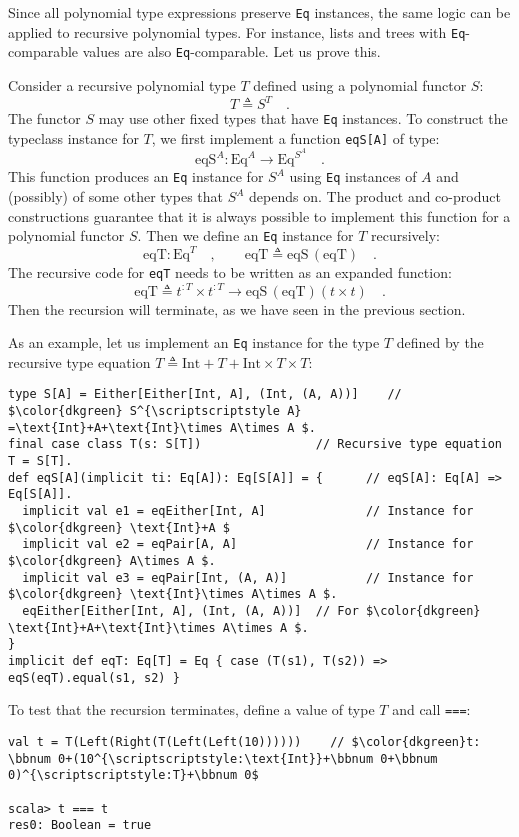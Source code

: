 Since all polynomial type expressions preserve \lstinline!Eq! instances,
the same logic can be applied to recursive polynomial types. For instance,
lists and trees with \lstinline!Eq!-comparable values are also \lstinline!Eq!-comparable.
Let us prove this.

Consider a recursive polynomial type $T$ defined using a polynomial
functor $S$:
\[
T\triangleq S^{T}\quad.
\]
The functor $S$ may use other fixed types that have \lstinline!Eq!
instances. To construct the typeclass instance for $T$, we first
implement a function \lstinline!eqS[A]! of type:
\[
\text{eqS}^{A}:\text{Eq}^{A}\rightarrow\text{Eq}^{S^{A}}\quad.
\]
This function produces an \lstinline!Eq! instance for $S^{A}$ using
\lstinline!Eq! instances of $A$ and (possibly) of some other types
that $S^{A}$ depends on. The product and co-product constructions
guarantee that it is always possible to implement this function for
a polynomial functor $S$. Then we define an \lstinline!Eq! instance
for $T$ recursively:
\[
\text{eqT}:\text{Eq}^{T}\quad,\quad\quad\text{eqT}\triangleq\text{eqS}\,(\text{eqT})\quad.
\]
The recursive code for \lstinline!eqT! needs to be written as an
expanded function:
\[
\text{eqT}\triangleq t^{:T}\times t^{:T}\rightarrow\text{eqS}\,(\text{eqT})\left(t\times t\right)\quad.
\]
Then the recursion will terminate, as we have seen in the previous
section.

As an example, let us implement an \lstinline!Eq! instance for the
type $T$ defined by the recursive type equation $T\triangleq\text{Int}+T+\text{Int}\times T\times T$:
\begin{lstlisting}[mathescape=true]
type S[A] = Either[Either[Int, A], (Int, (A, A))]    // $\color{dkgreen} S^{\scriptscriptstyle A} =\text{Int}+A+\text{Int}\times A\times A $.
final case class T(s: S[T])                // Recursive type equation T = S[T].
def eqS[A](implicit ti: Eq[A]): Eq[S[A]] = {      // eqS[A]: Eq[A] => Eq[S[A]].
  implicit val e1 = eqEither[Int, A]              // Instance for $\color{dkgreen} \text{Int}+A $
  implicit val e2 = eqPair[A, A]                  // Instance for $\color{dkgreen} A\times A $.
  implicit val e3 = eqPair[Int, (A, A)]           // Instance for $\color{dkgreen} \text{Int}\times A\times A $.
  eqEither[Either[Int, A], (Int, (A, A))]  // For $\color{dkgreen} \text{Int}+A+\text{Int}\times A\times A $.
}
implicit def eqT: Eq[T] = Eq { case (T(s1), T(s2)) => eqS(eqT).equal(s1, s2) }
\end{lstlisting}
To test that the recursion terminates, define a value of type $T$
and call \lstinline!===!:
\begin{lstlisting}[mathescape=true]
val t = T(Left(Right(T(Left(Left(10))))))    // $\color{dkgreen}t: \bbnum 0+(10^{\scriptscriptstyle:\text{Int}}+\bbnum 0+\bbnum 0)^{\scriptscriptstyle:T}+\bbnum 0$

scala> t === t
res0: Boolean = true
\end{lstlisting}


